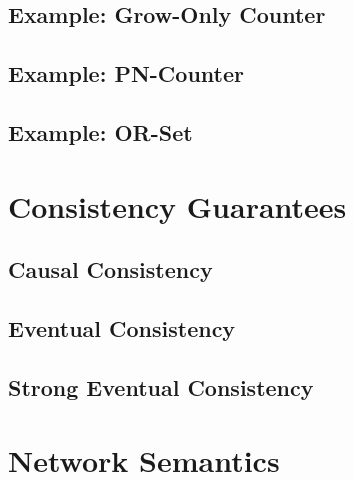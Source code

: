 \subsection{Example: Grow-Only Counter}
\subsection{Example: PN-Counter}
\subsection{Example: OR-Set}
\section{Consistency Guarantees}
\subsection{Causal Consistency}
\subsection{Eventual Consistency}
\subsection{Strong Eventual Consistency}
\section{Network Semantics}
